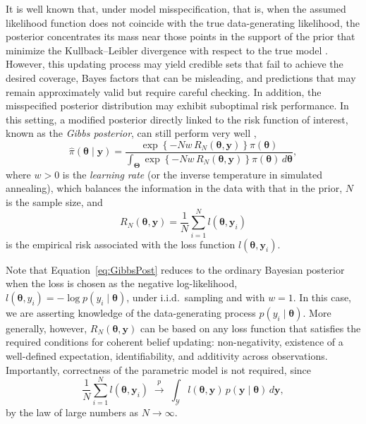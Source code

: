 It is well known that, under model misspecification, that is, when the assumed likelihood function does not coincide with the true data-generating likelihood, the posterior concentrates its mass near those points in the support of the prior that minimize the Kullback--Leibler divergence with respect to the true model \cite{Kleijn2006}. However, this updating process may yield credible sets that fail to achieve the desired coverage, Bayes factors that can be misleading, and predictions that may remain approximately valid but require careful checking. In addition, the misspecified posterior distribution may exhibit suboptimal risk performance. In this setting, a modified posterior directly linked to the risk function of interest, known as the \textit{Gibbs posterior}, can still perform very well \cite{Jiang2008},
\begin{equation}\label{eq:GibbsPost}
	\hat{\pi}(\boldsymbol{\theta}\mid\mathbf{y})
	=\frac{\exp\left\{-Nw\,R_N(\boldsymbol{\theta},\mathbf{y})\right\}\pi(\boldsymbol{\theta})}
	{\int_{\boldsymbol{\Theta}}\exp\left\{-Nw\,R_N(\boldsymbol{\theta},\mathbf{y})\right\}\pi(\boldsymbol{\theta})\,d\boldsymbol{\theta}},
\end{equation}
where $w>0$ is the \textit{learning rate} (or the inverse temperature in simulated annealing), which balances the information in the data with that in the prior, $N$ is the sample size, and
\[
R_N(\boldsymbol{\theta},\mathbf{y})=\frac{1}{N}\sum_{i=1}^N l(\boldsymbol{\theta},\mathbf{y}_i)
\]
is the empirical risk associated with the loss function $l(\boldsymbol{\theta},\mathbf{y}_i)$.

Note that Equation~\ref{eq:GibbsPost} reduces to the ordinary Bayesian posterior when the loss is chosen as the negative log-likelihood, $l(\boldsymbol{\theta},y_i)=-\log p(y_i\mid\boldsymbol{\theta})$, under i.i.d.\ sampling and with $w=1$. In this case, we are asserting knowledge of the data-generating process $p(y_i\mid \boldsymbol{\theta})$. More generally, however, $R_N(\boldsymbol{\theta},\mathbf{y})$ can be based on any loss function that satisfies the required conditions for coherent belief updating: non-negativity, existence of a well-defined expectation, identifiability, and additivity across observations. Importantly, correctness of the parametric model is not required, since
\[
\frac{1}{N}\sum_{i=1}^N l(\boldsymbol{\theta},\mathbf{y}_i)\;\stackrel{p}{\longrightarrow}\;\int_{\mathcal{Y}} l(\boldsymbol{\theta},\mathbf{y})\,p(\mathbf{y}\mid \boldsymbol{\theta})\,d\mathbf{y},
\]
by the law of large numbers as $N\to\infty$.

